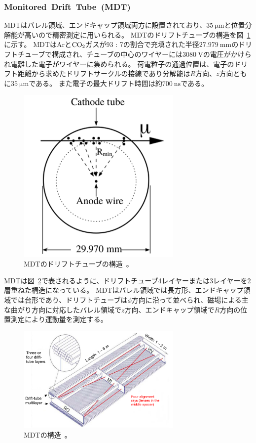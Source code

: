 \subsubsection{Monitored~Drift~Tube~(MDT)}
MDTはバレル領域、エンドキャップ領域両方に設置されており、$\SI{35}{\um}$と位置分解能が高いので精密測定に用いられる。
MDTのドリフトチューブの構造を図~\ref{fig:2-16}に示す。
MDTはArと$\rm{CO_{2}}$ガスが93 : 7の割合で充填された半径$\SI{27.979}{\mm}$のドリフトチューブで構成され、チューブの中心のワイヤーには$\SI{3080}{\V}$の電圧がかけられ電離した電子がワイヤーに集められる。
荷電粒子の通過位置は、電子のドリフト距離から求めたドリフトサークルの接線であり分解能は$R$方向、$z$方向ともに$\SI{35}{\um}$である。
また電子の最大ドリフト時間は約$\SI{700}{\ns}$である。

\begin{figure}[h]
  \centering
  \includegraphics[clip, width=8cm]{fig/2/mdt_driftTube.png}
  \caption{MDTのドリフトチューブの構造~\cite{Aad:1129811}。}
  \label{fig:2-16}
\end{figure}

MDTは図~\ref{fig:2-17}で表されるように、ドリフトチューブ4レイヤーまたは3レイヤーを2層重ねた構造になっている。
MDTはバレル領域では長方形、エンドキャップ領域では台形であり、ドリフトチューブは$\phi$方向に沿って並べられ、磁場による主な曲がり方向に対応したバレル領域で$z$方向、エンドキャップ領域で$R$方向の位置測定により運動量を測定する。

\begin{figure}[h]
  \centering
  \includegraphics[clip, width=8cm]{fig/2/MDT_chamber_schematics_2.pdf}
  \caption{MDTの構造~\cite{Aad:1129811}。}
  \label{fig:2-17}
\end{figure}

